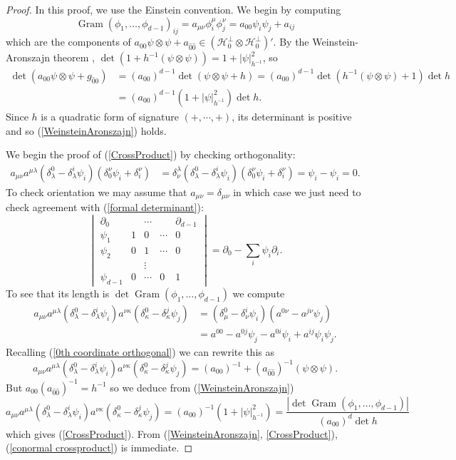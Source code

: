 \documentclass[reqno,12pt,letterpaper]{amsart}
\DeclareMathOperator{\Gram}{Gram}
\newcommand{\Hilb}{\mathcal H}
\theoremstyle{definition}
\numberwithin{equation}{section}
\begin{document}
\begin{proof}
In this proof, we use the Einstein convention.
We begin by computing
$$\Gram(\phi_1, \dots, \phi_{d - 1})_{ij} = a_{\mu \nu} \phi_i^\mu \phi_j^\nu = a_{00} \psi_i \psi_j + a_{ij}$$
which are the components of $a_{00}\psi \otimes \psi + a_{\hat 0 \hat 0} \in (\Hilb_0^\perp \otimes \Hilb_0^\perp)'$.
By the Weinstein-Aronszajn theorem \cite{Tao13}, $\det(1 + h^{-1}(\psi \otimes \psi)) = 1 + |\psi|_{h^{-1}}^2$, so
\begin{align*}
\det(a_{00}\psi \otimes \psi + g_{\hat 0 \hat 0})
&= (a_{00})^{d - 1} \det(\psi \otimes \psi + h) = (a_{00})^{d - 1} \det(h^{-1}(\psi \otimes \psi) + 1) \det h \\
&= (a_{00})^{d - 1} (1 + |\psi|_{h^{-1}}^2) \det h.
\end{align*}
Since $h$ is a quadratic form of signature $(+, \cdots, +)$, its determinant is positive and so (\ref{WeinsteinAronszajn}) holds.

We begin the proof of (\ref{CrossProduct}) by checking orthogonality:
\begin{align*}
a_{\mu\nu} a^{\mu \lambda} (\delta^0_\lambda - \delta^i_\lambda \psi_i)(\delta^\nu_0 \psi_i + \delta^\nu_i)
&= \delta^\lambda_\nu (\delta^0_\lambda - \delta^i_\lambda \psi_i)(\delta^\nu_0 \psi_i + \delta_i^\nu)
= \psi_i - \psi_i = 0.
\end{align*}
To check orientation we may assume that $a_{\mu\nu} = \delta_{\mu\nu}$ in which case we just need to check agreement with (\ref{formal determinant}):
$$\begin{vmatrix} \partial_0 && \cdots && \partial_{d - 1} \\
\psi_1 & 1 & 0 & \cdots & 0 \\
\psi_2 & 0 & 1 & \cdots & 0\\
&& \vdots \\
\psi_{d - 1} & 0 & \cdots & 0 & 1
\end{vmatrix} = \partial_0 - \sum_i \psi_i \partial_i.$$
To see that its length is $\det \Gram(\phi_1, \dots, \phi_{d - 1})$ we compute
\begin{align*}
a_{\mu \nu} a^{\mu \lambda}(\delta^0_\lambda - \delta^i_\lambda \psi_i) a^{\nu \kappa}(\delta_\kappa^0 - \delta_\kappa^j \psi_j)
&= (\delta_\mu^0 - \delta_\nu^i \psi_i)(a^{0 \nu} - a^{j \nu} \psi_j)\\
&= a^{00} - a^{0j} \psi_j - a^{0i} \psi_i + a^{ij} \psi_i \psi_j.
\end{align*}
Recalling (\ref{0th coordinate orthogonal}) we can rewrite this as
$$a_{\mu \nu} a^{\mu \lambda}(\delta^0_\lambda - \delta^i_\lambda \psi_i) a^{\nu \kappa}(\delta_\kappa^0 - \delta_\kappa^j \psi_j) = (a_{00})^{-1} + (a_{\hat 0 \hat 0})^{-1}(\psi \otimes \psi).$$
But $a_{00} (a_{\hat 0 \hat 0})^{-1} = h^{-1}$ so we deduce from (\ref{WeinsteinAronszajn})
$$a_{\mu \nu} a^{\mu \lambda}(\delta^0_\lambda - \delta^i_\lambda \psi_i) a^{\nu \kappa}(\delta_\kappa^0 - \delta_\kappa^j \psi_j) = (a_{00})^{-1} (1 + |\psi|_{h^{-1}}^2)
= \frac{|\det \Gram(\phi_1, \dots, \phi_{d - 1})|}{(a_{00})^d \det h}$$
which gives (\ref{CrossProduct}).
From (\ref{WeinsteinAronszajn}, \ref{CrossProduct}), (\ref{conormal crossproduct}) is immediate.
\end{proof}
\end{document}
